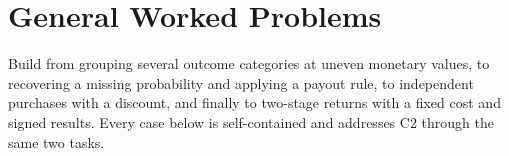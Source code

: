 \section{General Worked Problems}\label{sec:general}
Build from grouping several outcome categories at uneven monetary values, to recovering a missing probability and applying a payout rule, to independent purchases with a discount, and finally to two-stage returns with a fixed cost and signed results. Every case below is self-contained and addresses C2 through the same two tasks.

\clearpage
